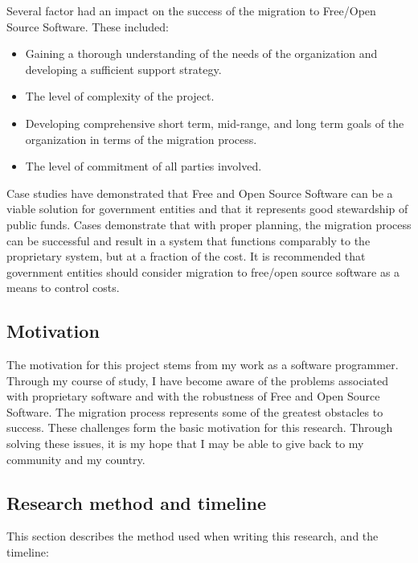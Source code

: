   Several factor had an impact on the success of the migration to Free/Open Source Software. These included: 
  \begin{itemize}
  \item Gaining a thorough understanding of the needs of the organization and developing 	a sufficient support strategy.
  \item The level of complexity of the project.
  \item Developing comprehensive short term, mid-range, and long term goals of the organization in terms of the migration process.
  \item The level of commitment of all parties involved.
  \end{itemize}
 
  Case studies have demonstrated that Free and Open Source Software can be a viable solution for government entities and that it represents good stewardship of public funds. Cases demonstrate that with proper planning, the migration process can be successful and result in a system that functions comparably to the proprietary system, but at a fraction of the cost. It is recommended that government entities should consider migration to free/open source software as a means to control costs. 

  \subsection{Motivation}

  The motivation for this project stems from my work as a software programmer. Through my course of study, I have become aware of the problems associated with proprietary software and with the robustness of Free and Open Source Software. The migration process represents some of the greatest obstacles to success. These challenges form the basic motivation for this research. Through solving these issues, it is my hope that I may be able to give back to my community and my country. 



  \subsection{Research method and timeline}

  This section describes the method used when writing this research, and the timeline:


